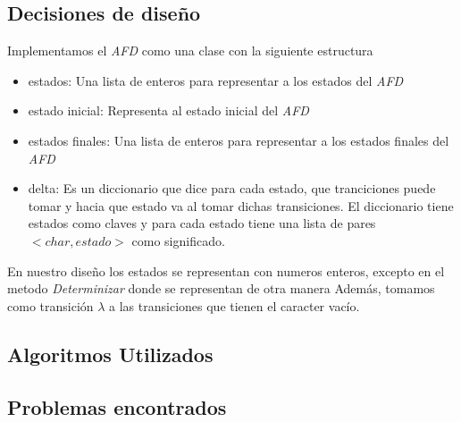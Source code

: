 \subsection{Decisiones de diseño}
Implementamos el \emph{AFD} como una clase con la siguiente estructura

\begin{itemize}
	\item estados: Una lista de enteros para representar a los estados del \emph{AFD}
	\item estado inicial: Representa al estado inicial del \emph{AFD}
	\item estados finales: Una lista de enteros para representar a los estados finales del \emph{AFD}
	\item delta: Es un diccionario que dice para cada estado, que tranciciones puede tomar y hacia que estado va al tomar dichas transiciones. El diccionario tiene estados como claves y para cada estado tiene una lista de pares $<char, estado>$ como significado.
\end{itemize}

En nuestro diseño los estados se representan con numeros enteros, excepto en el metodo \emph{Determinizar} donde se representan de otra manera %
Además, tomamos como transición $\lambda$ a las transiciones que tienen el caracter vacío.

\subsection{Algoritmos Utilizados}

\subsection{Problemas encontrados}
